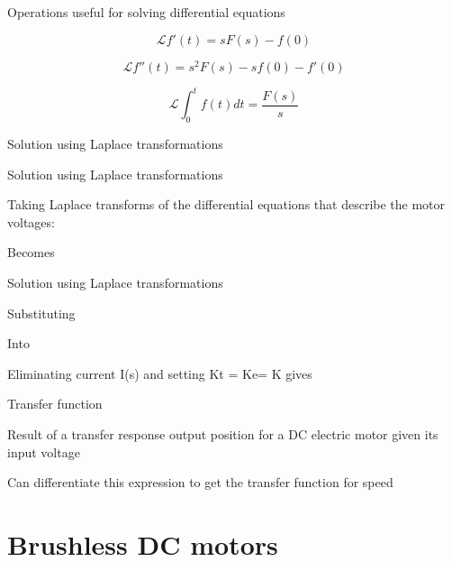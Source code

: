 \documentclass[compress]{beamer}
\begin{document}
\begin{frame}{Operations useful for solving differential equations}

\Large

\[
    \mathcal{L} {f'(t)} = sF(s) - f(0)
\]


\[
    \mathcal{L} {f''(t)} = s^2F(s) - sf(0) - f'(0)
\]


\[
    \mathcal{L} {\int^{t}_{0}f(t)dt} = \frac{F(s)}{s}
\]


\end{frame}

\begin{frame}{Solution using Laplace transformations}
%
%
%
%
%
%
%
\end{frame}

\begin{frame}{Solution using Laplace transformations}

Taking Laplace transforms of the differential equations that describe
the motor voltages:

Becomes

\end{frame}

\begin{frame}{Solution using Laplace transformations}

Substituting

Into

Eliminating current I(s) and setting Kt = Ke= K gives

\end{frame}

\begin{frame}{Transfer function}

Result of a transfer response output position for a DC electric motor
given its input voltage

Can differentiate this expression to get the transfer function for speed

\end{frame}

\section{Brushless DC motors}
\end{document}
